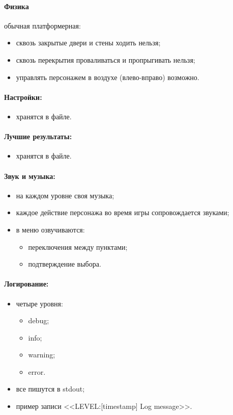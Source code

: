 \documentclass[12pt,a4paper,fullpage,titlepage]{article}
\begin{document}
\paragraph{Физика} обычная платформерная:
\begin{itemize}
	\item сквозь закрытые двери и стены ходить нельзя;
	\item сквозь перекрытия проваливаться и пропрыгивать нельзя;
	\item управлять персонажем в воздухе (влево-вправо) возможно.
\end{itemize}

\paragraph{Настройки:}
\begin{itemize}
	\item хранятся в файле.
\end{itemize}

\paragraph{Лучшие результаты:}
\begin{itemize}
	\item хранятся в файле.
\end{itemize}

\paragraph{Звук и музыка:}
\begin{itemize}
	\item на каждом уровне своя музыка;
	\item каждое действие персонажа во время игры сопровождается звуками;
	\item в меню озвучиваются:
	\begin{itemize}
		\item переключения между пунктами;
		\item подтверждение выбора.
	\end{itemize}
\end{itemize}

\paragraph{Логирование:}
\begin{itemize}
	\item четыре уровня:
	\begin{itemize}
		\item debug;
		\item info;
		\item warning;
		\item error.
	\end{itemize}
	\item все пишутся в stdout;
	\item пример записи <<LEVEL:[timestamp] Log message>>.
\end{itemize}
\end{document}
